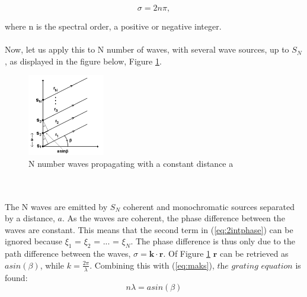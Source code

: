 \begin{equation}
    \sigma = 2 n \pi,
    \label{eq:maks}
\end{equation}

where n is the spectral order, a positive or negative integer. 
\\\\
Now, let us apply this to N number of waves, with several wave sources, up to $S_N$, as displayed in the figure below, Figure \ref{fig:Ninterference}.
\begin{figure}[h]
  \centering
    \includegraphics[width=0.3\textwidth]{Images/theory/Ninterference.png}
    \caption{N number waves propagating with a constant distance a}
    \label{fig:Ninterference}
\end{figure}
\\\\
The N waves are emitted by $S_N$ coherent and monochromatic sources separated by a distance, $a$. As the waves are coherent, the phase difference between the waves are constant. This means that the second term in (\ref{eq:2intphase}) can be ignored because $\xi_1$ = $\xi_2$ = ... = $\xi_N$. The phase difference is thus only due to the path difference between the waves, $\sigma = \textbf{k} \cdot \textbf{r}$. Of Figure \ref{fig:Ninterference}
$\textbf{r}$ can be retrieved as $a sin (\beta)$, while $k= \frac{2 \pi}{\lambda}$. Combining this with (\ref{eq:maks}), $\textit{the grating equation}$ is found: 
\begin{equation}
    n \lambda = a sin(\beta)
    \label{eq:transgrating}
\end{equation}

